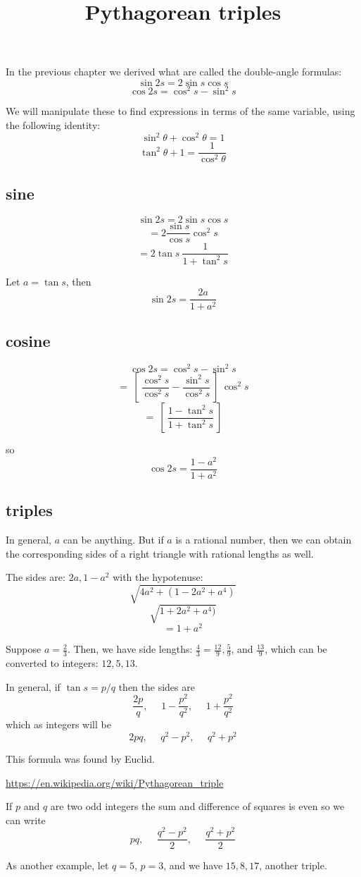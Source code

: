 \documentclass[11pt, oneside]{article}
\title{Pythagorean triples}
\date{}
\begin{document}
\maketitle
\Large


In the previous chapter we derived what are called the double-angle formulas:
\[ \sin 2s = 2 \sin s \cos s \]
\[ \cos 2s = \cos^2 s - \sin^2 s \]

We will manipulate these to find expressions in terms of the same variable, using the following identity:
\[ \sin^2 \theta + \cos^2 \theta = 1 \]
\[ \tan^2 \theta + 1 = \frac{1}{\cos^2 \theta} \]

\subsection*{sine}

\[ \sin 2s = 2 \sin s \cos s \]
\[ = 2 \frac{\sin s}{\cos s} \cos^2 s \]
\[ = 2 \tan s \ \frac{1}{1 + \tan^2 s} \]

Let $a = \tan s$, then
\[ \sin 2s = \frac{2a}{1 + a^2} \]

\subsection*{cosine}

\[ \cos 2s = \cos^2 s - \sin^2 s \]
\[ = \ [ \ \frac{\cos^2 s}{\cos^2 s} - \frac{\sin^2 s}{\cos^2 s} \ ] \ \cos^2 s \]
\[ = \ [ \ \frac{1 - \tan^2 s}{1 + \tan^2 s} \ ] \]
 
so
\[ \cos 2s = \frac{1 - a^2}{1 + a^2} \]

\subsection*{triples}

In general, $a$ can be anything.  But if $a$ is a rational number, then we can obtain the corresponding sides of a right triangle with rational lengths as well.  

The sides are:  $2a, 1 - a^2$ with the hypotenuse:
\[ \sqrt{4a^2 + (1 - 2a^2 + a^4)} \]
\[ \sqrt{1 + 2a^2 + a^4)} \]
\[ = 1 + a^2 \]

Suppose $a = \frac{2}{3}$.  Then, we have side lengths:  $\frac{4}{3} = \frac{12}{9},\frac{5}{9}$, and $\frac{13}{9}$, which can be converted to integers:  $12, 5, 13$.

In general, if $\tan s = p/q$ then the sides are
\[ \frac{2p}{q}, \ \ \ \ \ \ 1 - \frac{p^2}{q^2}, \ \ \ \ \ \ 1 +\frac{p^2}{q^2} \]
which as integers will be
\[ 2pq, \ \ \ \ \ \ q^2 - p^2, \ \ \ \ \ \ q^2 + p^2 \]

This formula was found by Euclid.

\url{https://en.wikipedia.org/wiki/Pythagorean_triple}

If $p$ and $q$ are two odd integers the sum and difference of squares is even so we can write
\[ pq, \ \ \ \ \ \ \frac{q^2 - p^2}{2}, \ \ \ \ \ \ \frac{q^2 + p^2}{2} \]

As another example, let $q = 5$, $p = 3$, and we have $15, 8, 17$, another triple.
\end{document}
